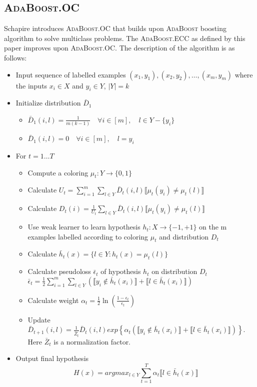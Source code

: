 \documentclass[11pt]{article}
\begin{document}
\subsection{\textsc{AdaBoost}.OC}
Schapire\cite{s-ocbmlp-97} introduces \textsc{AdaBoost}.OC that builds upon \textsc{AdaBoost} boosting algorithm to solve multiclass problems. The \textsc{AdaBoost}.ECC as defined by this paper improves upon \textsc{AdaBoost}.OC. The description of the algorithm is as follows:
\begin{itemize}
\item Input sequence of labelled examples $(x_1, y_1), (x_2, y_2), \ldots, (x_m, y_m)$ where the inputs $x_i \in X$ and $y_i \in Y$, $|Y| = k$
\item Initialize distribution $\bar D_1$
\begin{itemize}
\item $\bar D_1(i, l) = \frac{1}{m(k-1)}\quad \forall i \in [m],\quad l \in Y - \{y_i\}$
\item $\bar D_1(i, l) = 0 \quad \forall i \in [m],\quad l = y_i$
\end{itemize}
\item For $t =  1 \ldots T$
\begin{itemize}
\item Compute a coloring $\mu_t : Y \rightarrow \{0,1\}$
\item Calculate $U_t = \sum_{i=1}^m \sum_{l \in Y} \bar D_t(i,l) \llbracket \mu_t(y_i) \neq \mu_t(l)\rrbracket$
\item Calculate $D_t(i) = \frac{1}{U_t} \sum_{l \in Y} \bar D_t(i,l) \llbracket \mu_t(y_i) \neq \mu_t(l)\rrbracket$
\item Use weak learner to learn hypothesis $h_t : X \rightarrow \{-1,+1\}$ on the m examples labelled according to coloring $\mu_t$ and distribution $D_t$
\item Calculate $\bar h_t(x) = \{l \in Y : h_t(x) = \mu_t(l)\}$
\item Calculate pseudoloss $\bar \epsilon_t$ of hypothesis $h_t$ on distribution $D_t$\\
$\bar \epsilon_t = \frac{1}{2} \sum_{i=1}^m \sum_{l \in Y} (\llbracket y_i \notin \bar h_t(x_i)\rrbracket + \llbracket l \in \bar h_t(x_i) \rrbracket)$
\item Calculate weight $\alpha_t = \frac{1}{2} \ln \left( \frac{1-\epsilon_t}{\epsilon_t}\right)$
\item Update $\bar D_{t+1}(i,l) = \frac{1}{\bar Z_t} \bar D_t(i,l) exp \left\{ \alpha_t(\llbracket y_i \notin \bar h_t(x_i)\rrbracket + \llbracket l \in \bar h_t(x_i) \rrbracket)\right\}$. Here $\bar Z_t$ is a normalization factor.
\end{itemize}
\item Output final hypothesis $$H(x) = argmax_{l \in Y} \sum_{t=1}^T \alpha_t \llbracket l \in \bar h_t(x) \rrbracket$$
\end{itemize}
\end{document}

